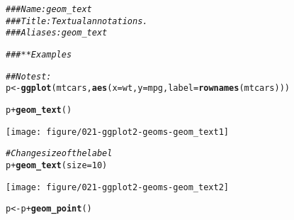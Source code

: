 \documentclass[a4paper,titlepage]{tufte-handout}\usepackage[]{graphicx}\usepackage[]{color}
\makeatletter
\def\maxwidth{ %
  \ifdim\Gin@nat@width>\linewidth
    \linewidth
  \else
    \Gin@nat@width
  \fi
}
\newcommand{\hlnum}[1]{\textcolor[rgb]{0.686,0.059,0.569}{#1}}%
\newcommand{\hlcom}[1]{\textcolor[rgb]{0.678,0.584,0.686}{\textit{#1}}}%
\newcommand{\hlopt}[1]{\textcolor[rgb]{0,0,0}{#1}}%
\newcommand{\hlstd}[1]{\textcolor[rgb]{0.345,0.345,0.345}{#1}}%
\newcommand{\hlkwb}[1]{\textcolor[rgb]{0.69,0.353,0.396}{#1}}%
\newcommand{\hlkwc}[1]{\textcolor[rgb]{0.333,0.667,0.333}{#1}}%
\newcommand{\hlkwd}[1]{\textcolor[rgb]{0.737,0.353,0.396}{\textbf{#1}}}%
\newenvironment{kframe}{%
 \def\at@end@of@kframe{}%
 \ifinner\ifhmode%
  \def\at@end@of@kframe{\end{minipage}}%
  \begin{minipage}{\columnwidth}%
 \fi\fi%
 \def\FrameCommand##1{\hskip\@totalleftmargin \hskip-\fboxsep
 \colorbox{shadecolor}{##1}\hskip-\fboxsep
     \hskip-\linewidth \hskip-\@totalleftmargin \hskip\columnwidth}%
 \MakeFramed {\advance\hsize-\width
   \@totalleftmargin\z@ \linewidth\hsize
   \@setminipage}}%
 {\par\unskip\endMakeFramed%
 \at@end@of@kframe}
\newenvironment{knitrout}{}{} %
\makeatother
\begin{document}
\begin{knitrout}
\color{fgcolor}\begin{kframe}
\begin{alltt}
\hlcom{### Name: geom_text}
\hlcom{### Title: Textual annotations.}
\hlcom{### Aliases: geom_text}

\hlcom{### ** Examples}

\hlcom{## No test: }
\hlstd{p} \hlkwb{<-} \hlkwd{ggplot}\hlstd{(mtcars,} \hlkwd{aes}\hlstd{(}\hlkwc{x}\hlstd{=wt,} \hlkwc{y}\hlstd{=mpg,} \hlkwc{label}\hlstd{=}\hlkwd{rownames}\hlstd{(mtcars)))}

\hlstd{p} \hlopt{+} \hlkwd{geom_text}\hlstd{()}
\end{alltt}
\end{kframe}
\texttt{[image: figure/021-ggplot2-geoms-geom\_text1]} 
\begin{kframe}\begin{alltt}
\hlcom{# Change size of the label}
\hlstd{p} \hlopt{+} \hlkwd{geom_text}\hlstd{(}\hlkwc{size}\hlstd{=}\hlnum{10}\hlstd{)}
\end{alltt}
\end{kframe}
\texttt{[image: figure/021-ggplot2-geoms-geom\_text2]} 
\begin{kframe}\begin{alltt}
\hlstd{p} \hlkwb{<-} \hlstd{p} \hlopt{+} \hlkwd{geom_point}\hlstd{()}


\end{alltt}
\end{kframe}
\end{knitrout}
\end{document}
